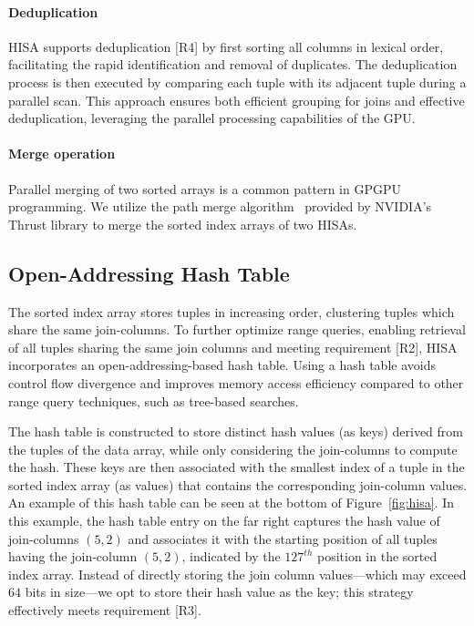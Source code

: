 \documentclass[nonacm,sigplan]{acmart}
\newcommand{\revised}[1]{{#1}}
\begin{document}
\paragraph*{Deduplication}
\label{sec:impl-data-insert}
HISA  supports deduplication [R4] by first sorting all columns in lexical order, facilitating the rapid identification and removal of duplicates. The deduplication process is then executed by comparing each tuple with its adjacent tuple during a parallel scan. This approach ensures both efficient grouping for joins and effective deduplication, leveraging the parallel processing capabilities of the GPU.

\paragraph*{Merge operation}
\revised{Parallel merging of two sorted arrays is a common pattern in GPGPU programming. We utilize the path merge algorithm~\cite{green2012merge} provided by NVIDIA’s Thrust library to merge the sorted index arrays of two HISAs.}


\subsection{Open-Addressing Hash Table}
The sorted index array stores tuples in increasing order, clustering tuples which share the same join-columns.
To further optimize range queries, enabling retrieval of all tuples sharing the same join columns and meeting requirement [R2], HISA incorporates an open-addressing-based hash table. Using a hash table avoids control flow divergence and improves memory access efficiency compared to other range query techniques, such as tree-based searches.

The hash table is constructed to store distinct hash values (as keys) derived from the tuples of the data array, while only considering the join-columns to compute the hash. These keys are then associated with the smallest index of a tuple in the sorted index array (as values) that contains the corresponding join-column values.
An example of this hash table can be seen at the bottom of Figure~\ref{fig:hisa}. In this example, the hash table entry on the far right captures the hash value of join-columns $(5,2)$ and associates it with the starting position of all tuples having the join-column $(5,2)$, indicated by the $127^{th}$ position in the sorted index array.
Instead of directly storing the join column values---which may exceed $64$ bits in size---we opt to store their hash value as the key; this strategy effectively meets requirement [R3].
\end{document}
